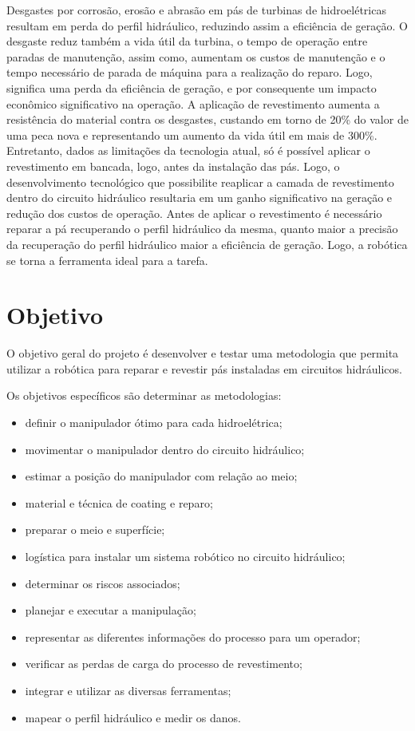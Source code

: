 Desgastes por corrosão, erosão e abrasão em pás de turbinas de hidroelétricas
resultam em perda do perfil hidráulico, reduzindo assim a eficiência de geração.
O desgaste reduz também a vida útil da turbina, o tempo de operação entre
paradas de manutenção, assim como, aumentam os custos de manutenção e o tempo
necessário de parada de máquina para a realização do reparo. Logo, significa uma
perda da eficiência de geração, e por consequente um impacto econômico
significativo na operação.
A aplicação de revestimento aumenta a resistência do material contra os
desgastes, custando em torno de 20\% do valor de uma peca nova e representando
um aumento da vida útil em mais de 300\%. Entretanto, dados as limitações da
tecnologia atual, só é possível aplicar o revestimento em bancada, logo, antes
da instalação das pás. Logo, o desenvolvimento tecnológico que possibilite
reaplicar a camada de revestimento dentro do circuito hidráulico resultaria em
um ganho significativo na geração e redução dos custos de operação.
Antes de aplicar o revestimento é necessário reparar a pá recuperando o perfil
hidráulico da mesma, quanto maior a precisão da recuperação do perfil hidráulico
maior a eficiência de geração. Logo, a robótica se torna a ferramenta ideal para a tarefa.

\section{Objetivo}

O objetivo geral do projeto é desenvolver e testar uma metodologia que permita
utilizar a robótica para reparar e revestir pás instaladas em circuitos hidráulicos.

Os objetivos específicos são determinar as metodologias: 

\begin{itemize}
  \item definir o manipulador ótimo para cada hidroelétrica; 
  \item movimentar o manipulador dentro do circuito hidráulico;
  \item estimar a posição do manipulador com relação ao meio;
  \item material e técnica de coating e reparo; 
  \item preparar o meio e superfície;
  \item logística para instalar um sistema robótico no circuito hidráulico;
  \item determinar os riscos associados;
  \item planejar e executar a manipulação;
  \item representar as diferentes informações do processo para um operador;
  \item verificar as perdas de carga do processo de revestimento;
  \item integrar e utilizar as diversas ferramentas;
  \item mapear o perfil hidráulico e medir os danos.
\end{itemize}

